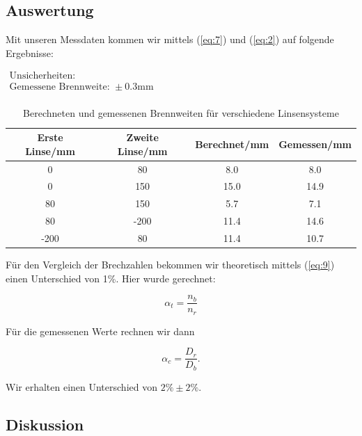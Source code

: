 \documentclass[11pt,a4paper]{article}
\begin{document}
\pagebreak

\subsection{Auswertung}

Mit unseren Messdaten kommen wir mittels (\ref{eq:7}) und (\ref{eq:2}) auf folgende Ergebnisse:

\begin{table}[h]
\centering
\caption{Berechneten und gemessenen Brennweiten f\"ur verschiedene Linsensysteme} \vspace{11pt}
$\begin{array}{l}
\textrm{Unsicherheiten:}\\
\textrm{Gemessene Brennweite: } \pm 0.3 \textrm{mm}\\
\end{array}$
\begin{tabular}{cccc}
\toprule
\textrm{Erste Linse}/\textrm{mm} & \textrm{Zweite Linse}/\textrm{mm} & \textrm{Berechnet}/\textrm{mm} & \textrm{Gemessen}/\textrm{mm} \\
\midrule 
0 & 80 & 8.0 & 8.0 \\
0 & 150 & 15.0 & 14.9 \\
80 & 150 & 5.7 & 7.1 \\
80 & -200 & 11.4 & 14.6 \\
-200 & 80 & 11.4 & 10.7 \\
\bottomrule
\end{tabular}
\label{Tab:X}
\end{table}

F\"ur den Vergleich der Brechzahlen bekommen wir theoretisch mittels (\ref{eq:9}) einen Unterschied von 1\%. Hier wurde gerechnet:

\[
\alpha_t=\frac{n_b}{n_r}
\]

F\"ur die gemessenen Werte rechnen wir dann

\[\alpha_c=\frac{D_r}{D_b}.\]

Wir erhalten einen Unterschied von $2\%\pm2\%$.

\subsection{Diskussion}
\end{document}
